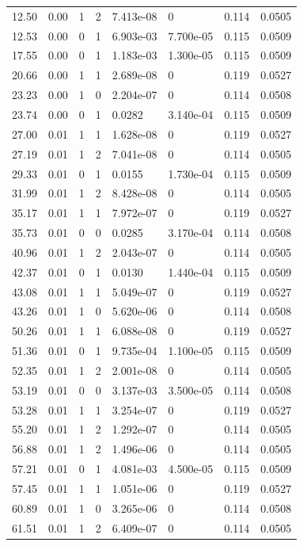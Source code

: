 \documentclass[preview]{standalone}
\begin{document}
{{\begin{tabular}{L{1.2cm}C{1.2cm} C{0.3cm}C{0.5cm} C{1.4cm}C{1.4cm} C{1.4cm}C{1.4cm}}
  12.50  &  0.00  & 1     &  2 &  7.413e-08  & 0  & 0.114 &  0.0505   \\ 
  12.53  &  0.00  & 0     &  1 &  6.903e-03  & 7.700e-05  & 0.115 &  0.0509   \\ 
  17.55  &  0.00  & 0     &  1 &  1.183e-03  & 1.300e-05  & 0.115 &  0.0509   \\ 
  20.66  &  0.00  & 1     &  1 &  2.689e-08  & 0  & 0.119 &  0.0527   \\ 
  23.23  &  0.00  & 1     &  0 &  2.204e-07  & 0  & 0.114 &  0.0508   \\ 
  23.74  &  0.00  & 0     &  1 &  0.0282  & 3.140e-04  & 0.115 &  0.0509   \\ 
  27.00  &  0.01  & 1     &  1 &  1.628e-08  & 0  & 0.119 &  0.0527   \\ 
  27.19  &  0.01  & 1     &  2 &  7.041e-08  & 0  & 0.114 &  0.0505   \\ 
  29.33  &  0.01  & 0     &  1 &  0.0155  & 1.730e-04  & 0.115 &  0.0509   \\ 
  31.99  &  0.01  & 1     &  2 &  8.428e-08  & 0  & 0.114 &  0.0505   \\ 
  35.17  &  0.01  & 1     &  1 &  7.972e-07  & 0  & 0.119 &  0.0527   \\ 
  35.73  &  0.01  & 0     &  0 &  0.0285  & 3.170e-04  & 0.114 &  0.0508   \\ 
  40.96  &  0.01  & 1     &  2 &  2.043e-07  & 0  & 0.114 &  0.0505   \\ 
  42.37  &  0.01  & 0     &  1 &  0.0130  & 1.440e-04  & 0.115 &  0.0509   \\ 
  43.08  &  0.01  & 1     &  1 &  5.049e-07  & 0  & 0.119 &  0.0527   \\ 
  43.26  &  0.01  & 1     &  0 &  5.620e-06  & 0  & 0.114 &  0.0508   \\ 
  50.26  &  0.01  & 1     &  1 &  6.088e-08  & 0  & 0.119 &  0.0527   \\ 
  51.36  &  0.01  & 0     &  1 &  9.735e-04  & 1.100e-05  & 0.115 &  0.0509   \\ 
  52.35  &  0.01  & 1     &  2 &  2.001e-08  & 0  & 0.114 &  0.0505   \\ 
  53.19  &  0.01  & 0     &  0 &  3.137e-03  & 3.500e-05  & 0.114 &  0.0508   \\ 
  53.28  &  0.01  & 1     &  1 &  3.254e-07  & 0  & 0.119 &  0.0527   \\ 
  55.20  &  0.01  & 1     &  2 &  1.292e-07  & 0  & 0.114 &  0.0505   \\ 
  56.88  &  0.01  & 1     &  2 &  1.496e-06  & 0  & 0.114 &  0.0505   \\ 
  57.21  &  0.01  & 0     &  1 &  4.081e-03  & 4.500e-05  & 0.115 &  0.0509   \\ 
  57.45  &  0.01  & 1     &  1 &  1.051e-06  & 0  & 0.119 &  0.0527   \\ 
  60.89  &  0.01  & 1     &  0 &  3.265e-06  & 0  & 0.114 &  0.0508   \\ 
  61.51  &  0.01  & 1     &  2 &  6.409e-07  & 0  & 0.114 &  0.0505   \\ 
\hline 
\end{tabular} 

}}
\end{document}

